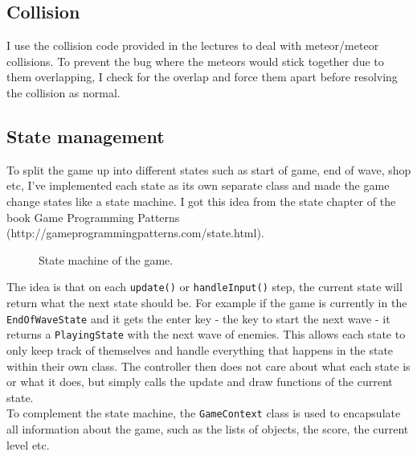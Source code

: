 \documentclass{article}
\newcommand{\n}[0]{\\[\baselineskip]}
\begin{document}
\subsection{Collision}
I use the collision code provided in the lectures to deal with meteor/meteor collisions. To prevent the bug where the meteors would stick together due to them overlapping, I check for the overlap and force them apart before resolving the collision as normal. 

\subsection{State management}
To split the game up into different states such as start of game, end of wave, shop etc, I've implemented each state as its own separate class and made the game change states like a state machine. I got this idea from the state chapter of the book Game Programming Patterns (http://gameprogrammingpatterns.com/state.html).
\begin{figure}[H]
\caption{State machine of the game.}
\end{figure}
\noindent
The idea is that on each \texttt{update()} or \texttt{handleInput()} step, the current state will return what the next state should be. For example if the game is currently in the \texttt{EndOfWaveState} and it gets the enter key - the key to start the next wave - it returns a \texttt{PlayingState} with the next wave of enemies. This allows each state to only keep track of themselves and handle everything that happens in the state within their own class. The controller then does not care about what each state is or what it does, but simply calls the update and draw functions of the current state. 
\n
To complement the state machine, the \texttt{GameContext} class is used to encapsulate all information about the game, such as the lists of objects, the score, the current level etc. 
\end{document}
